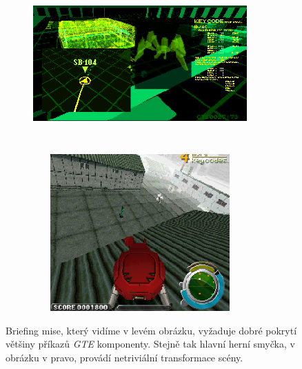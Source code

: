 \begin{figure}[hbt]
    \begin{subfigure}{0.5\textwidth}
        \centering
        \includegraphics[width=0.9\textwidth, height=6cm]{obrazky-figures/gits-showcase-1.png}
    \end{subfigure}
    \begin{subfigure}{0.5\textwidth}
        \centering
        \includegraphics[width=0.9\textwidth, height=6cm]{obrazky-figures/gits-showcase-2.png}
    \end{subfigure}
    \caption[Test hry \textit{Ghost in the Shell}]{Briefing mise, který vidíme v levém obrázku, vyžaduje dobré pokrytí většiny příkazů \textit{GTE} komponenty.
    Stejně tak hlavní herní smyčka, v obrázku v pravo, provádí netriviální transformace scény.}
    \label{gits-showcase-1}
\end{figure}

